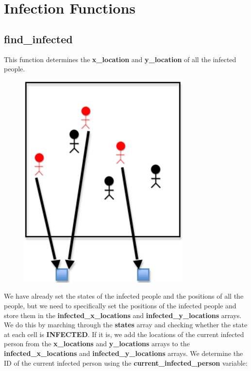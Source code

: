 \documentclass[letterpaper,10pt,openany,oneside]{sphinxmanual}
\begin{document}
\chapter{Infection Functions}
\label{4-Infection/infection:infection-functions}\label{4-Infection/infection::doc}

\section{find\_infected}
\label{4-Infection/infection:find-infected}
This function determines the \textbf{x\_location} and \textbf{y\_location} of all the infected people.
\begin{figure}[htbp]
\centering

\includegraphics{img-16.png}
\end{figure}

We have already set the states of the infected people and the positions
of all the people, but we need to specifically set the positions of the
infected people and store them in the \textbf{infected\_x\_locations} and
\textbf{infected\_y\_locations} arrays. We do this by marching through the
\textbf{states} array and checking whether the state at each cell is
\textbf{INFECTED}. If it is, we add the locations of the current infected person
from the \textbf{x\_locations} and \textbf{y\_locations} arrays to the
\textbf{infected\_x\_locations} and \textbf{infected\_y\_locations} arrays. We
determine the ID of the current infected person using the
\textbf{current\_infected\_person} variable:
\end{document}
